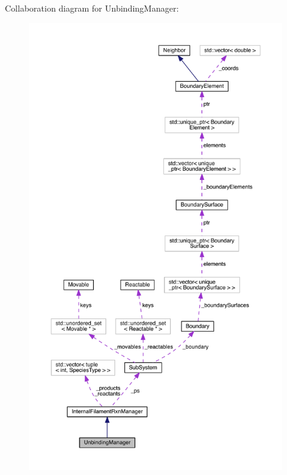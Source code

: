 Collaboration diagram for Unbinding\+Manager\+:\nopagebreak
\begin{figure}[H]
\begin{center}
\leavevmode
\includegraphics[height=550pt]{classUnbindingManager__coll__graph}
\end{center}
\end{figure}

